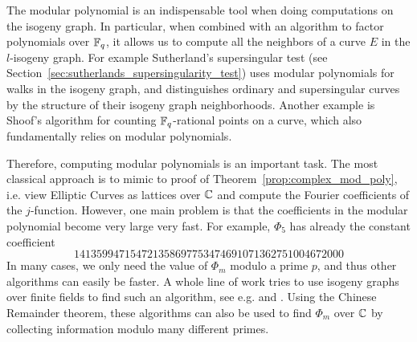 The modular polynomial is an indispensable tool when doing computations on the isogeny graph.
In particular, when combined with an algorithm to factor polynomials over $\mathbb{F}_q$, it allows us to compute all the neighbors of a curve $E$ in the $l$-isogeny graph.
For example Sutherland's supersingular test (see Section~\ref{sec:sutherlands_supersingularity_test}) uses modular polynomials for walks in the isogeny graph, and distinguishes ordinary and supersingular curves by the structure of their isogeny graph neighborhoods.
Another example is Shoof's algorithm \cite{shoof_point_counting} for counting $\mathbb{F}_q$-rational points on a curve, which also fundamentally relies on modular polynomials.

Therefore, computing modular polynomials is an important task.
The most classical approach is to mimic to proof of Theorem~\ref{prop:complex_mod_poly}, i.e. view Elliptic Curves as lattices over $\mathbb{C}$ and compute the Fourier coefficients of the $j$-function.
However, one main problem is that the coefficients in the modular polynomial become very large very fast.
For example, $\Phi_5$ has already the constant coefficient
\begin{equation*}
    141359947154721358697753474691071362751004672000
\end{equation*}
In many cases, we only need the value of $\Phi_m$ modulo a prime $p$, and thus other algorithms can easily be faster.
A whole line of work tries to use isogeny graphs over finite fields to find such an algorithm, see e.g. \cite{compute_modular_polynomial} and \cite{compute_modular_polynomial2}.
Using the Chinese Remainder theorem, these algorithms can also be used to find $\Phi_m$ over $\mathbb{C}$ by collecting information modulo many different primes.
